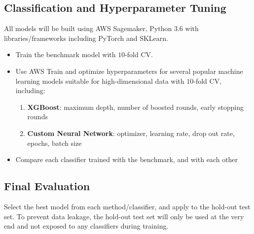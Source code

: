 \documentclass[11pt]{diazessay}
\begin{document}
\subsection{Classification and Hyperparameter Tuning}

All models will be built using AWS Sagemaker, Python 3.6 with libraries/frameworks including PyTorch and SKLearn.

\begin{itemize}
	\item Train the benchmark model with $10$-fold CV.
	\item Use AWS Train and optimize hyperparameters for several popular machine learning models suitable for high-dimensional data with $10$-fold CV, including: 
	\begin{enumerate}
		\item \textbf{XGBoost}: maximum depth, number of boosted rounds, early stopping rounds
		\item \textbf{Custom Neural Network}: optimizer, learning rate, drop out rate, epochs, batch size
	\end{enumerate}
	\item Compare each classifier trained with the benchmark, and with each other
\end{itemize} 

\subsection{Final Evaluation}

Select the best model from each method/classifier, and apply to the hold-out test set. To prevent data leakage, the hold-out test set will only be used at the very end and not exposed to any classifiers during training. 

\vskip0.4in



\end{document}

